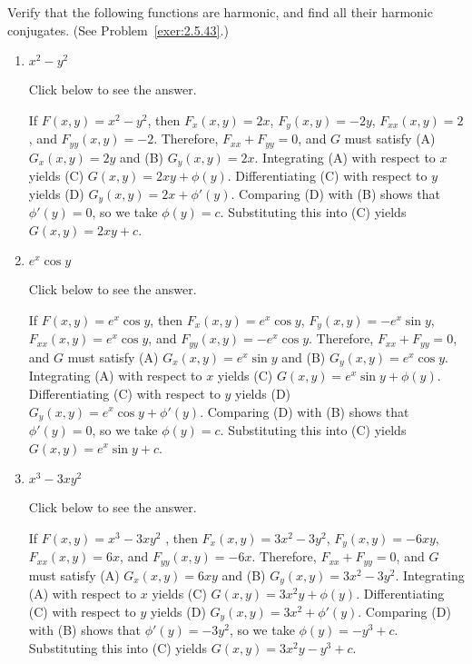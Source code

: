 \documentclass{ximera}
\begin{document}
\begin{problem}\label{exer:2.5.44}
Verify that the following functions are harmonic, and find all their harmonic conjugates.  (See Problem~\ref{exer:2.5.43}.)

\begin{enumerate}
    \item $x^2-y^2$

    Click below to see the answer.

    \begin{expandable}
        If $F(x,y)=x^2-y^2$, then $F_x(x,y)=2x$, $F_y(x,y)=-2y$,
$F_{xx}(x,y)=2$, and $F_{yy}(x,y)=-2$.
Therefore, $F_{xx}+F_{yy}=0$, and $G$ must satisfy
(A) $G_x(x,y)=2y$ and (B) $G_y(x,y)=2x$.
Integrating (A) with respect to $x$ yields
(C) $G(x,y)=2xy+\phi(y)$.
Differentiating
(C) with respect to
$y$ yields
(D) $G_y(x,y)=2x+\phi'(y)$.
Comparing (D) with (B)  shows that
$\phi'(y)=0$, so we take
$\phi(y)=c$.
Substituting this into (C) yields
$G(x,y)=2xy+c$.
    \end{expandable}
    
    \item $e^x\cos y$

    Click below to see the answer.

    \begin{expandable}
        If $F(x,y)=e^x\cos y$, then $F_x(x,y)=e^x\cos y$,
 $F_y(x,y)=-e^x\sin y$,
$F_{xx}(x,y)=e^x\cos y$, and $F_{yy}(x,y)=-e^x\cos y$.
Therefore, $F_{xx}+F_{yy}=0$, and $G$ must satisfy
(A) $G_x(x,y)=e^x\sin y$ and (B) $G_y(x,y)=e^x\cos y$.
Integrating (A) with respect to $x$ yields
(C) $G(x,y)=e^x\sin y+\phi(y)$.
Differentiating (C) with respect to $y$  yields
(D) $G_y(x,y)=e^x\cos y+\phi'(y)$.
Comparing (D) with (B)  shows that
$\phi'(y)=0$, so we take
$\phi(y)=c$.
Substituting this into (C) yields
$G(x,y)=e^x\sin y+c$.
    \end{expandable}
    
    \item $x^3-3xy^2$

    Click below to see the answer.

    \begin{expandable}
        If $F(x,y)=x^3-3xy^2$ , then $F_x(x,y)=3x^2-3y^2$, $F_y(x,y)=-6xy$,
$F_{xx}(x,y)=6x$, and $F_{yy}(x,y)=-6x$.
Therefore, $F_{xx}+F_{yy}=0$, and $G$ must satisfy
(A) $G_x(x,y)=6xy$ and (B) $G_y(x,y)=3x^2-3y^2$.
Integrating (A) with respect to $x$ yields
(C) $G(x,y)=3x^2y+\phi(y)$.
Differentiating (C) with respect to $y$  yields
(D) $G_y(x,y)=3x^2+\phi'(y)$.
Comparing (D) with (B)  shows that
$\phi'(y)=-3y^2$, so we take
$\phi(y)=-y^3+c$.
Substituting this into (C) yields
$G(x,y)=3x^2y-y^3+c$.
    \end{expandable}
    

\end{enumerate}
\end{problem}
\end{document}
